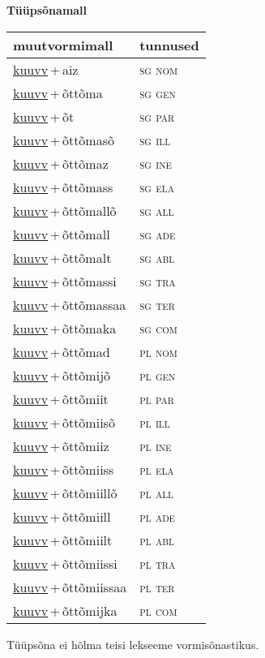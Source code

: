 
\vspace{1.8em}
\begin{minipage}{\textwidth}
\textbf{Tüüpsõnamall \,}\\

\begin{sideways}
\begin{tabular}{l l}
muutvormimall & tunnused \\
\hline
\underline{kuuvv}\,+\,aiz & \textsc{ sg nom } \\
\underline{kuuvv}\,+\,õttõma & \textsc{ sg gen } \\
\underline{kuuvv}\,+\,õt & \textsc{ sg par } \\
\underline{kuuvv}\,+\,õttõmasõ & \textsc{ sg ill } \\
\underline{kuuvv}\,+\,õttõmaz & \textsc{ sg ine } \\
\underline{kuuvv}\,+\,õttõmass & \textsc{ sg ela } \\
\underline{kuuvv}\,+\,õttõmallõ & \textsc{ sg all } \\
\underline{kuuvv}\,+\,õttõmall & \textsc{ sg ade } \\
\underline{kuuvv}\,+\,õttõmalt & \textsc{ sg abl } \\
\underline{kuuvv}\,+\,õttõmassi & \textsc{ sg tra } \\
\underline{kuuvv}\,+\,õttõmassaa & \textsc{ sg ter } \\
\underline{kuuvv}\,+\,õttõmaka & \textsc{ sg com } \\
\underline{kuuvv}\,+\,õttõmad & \textsc{ pl nom } \\
\underline{kuuvv}\,+\,õttõmijõ & \textsc{ pl gen } \\
\underline{kuuvv}\,+\,õttõmiit & \textsc{ pl par } \\
\underline{kuuvv}\,+\,õttõmiisõ & \textsc{ pl ill } \\
\underline{kuuvv}\,+\,õttõmiiz & \textsc{ pl ine } \\
\underline{kuuvv}\,+\,õttõmiiss & \textsc{ pl ela } \\
\underline{kuuvv}\,+\,õttõmiillõ & \textsc{ pl all } \\
\underline{kuuvv}\,+\,õttõmiill & \textsc{ pl ade } \\
\underline{kuuvv}\,+\,õttõmiilt & \textsc{ pl abl } \\
\underline{kuuvv}\,+\,õttõmiissi & \textsc{ pl tra } \\
\underline{kuuvv}\,+\,õttõmiissaa & \textsc{ pl ter } \\
\underline{kuuvv}\,+\,õttõmijka & \textsc{ pl com } \\
\end{tabular}
\end{sideways}
\label{tab:tüüpsõnamall-kuuvvaiz}

\end{minipage}

 
\vspace{1em}
\noindent Tüüpsõna ei hõlma teisi lekseeme vormi\-sõnastikus.
